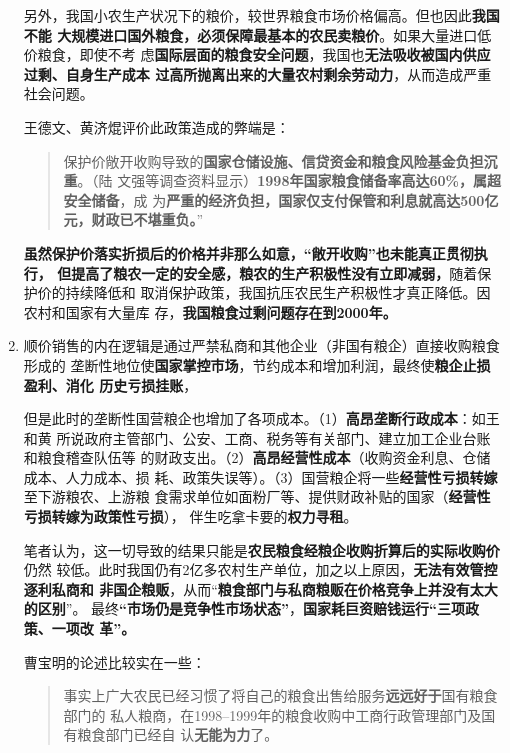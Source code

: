 \begin{enumerate}
  另外，我国小农生产状况下的粮价，较世界粮食市场价格偏高。但也因此\textbf{我国不能
    大规模进口国外粮食，必须保障最基本的农民卖粮价}。如果大量进口低价粮食，即使不考
  虑\textbf{国际层面的粮食安全问题}，我国也\textbf{无法吸收被国内供应过剩、自身生产成本
    过高所抛离出来的大量农村剩余劳动力}，从而造成严重社会问题。

  王德文、黄济焜评价此政策造成的弊端是：
  \begin{quotation}
    保护价敞开收购导致的\textbf{国家仓储设施、信贷资金和粮食风险基金负担沉重}。（陆
    文强等调查资料显示）\textbf{1998年国家粮食储备率高达60\%，属超安全储备}，成
    为\textbf{严重的经济负担，国家仅支付保管和利息就高达500亿元，财政已不堪重负。}”
  \end{quotation}

  \textbf{虽然保护价落实折损后的价格并非那么如意，“敞开收购”也未能真正贯彻执行，
    但提高了粮农一定的安全感，粮农的生产积极性没有立即减弱，}随着保护价的持续降低和
  取消保护政策，我国抗压农民生产积极性才真正降低。因农村和国家有大量库
  存，\textbf{我国粮食过剩问题存在到2000年。}

\item 顺价销售的内在逻辑是通过严禁私商和其他企业（非国有粮企）直接收购粮食形成的
  垄断性地位使\textbf{国家掌控市场}，节约成本和增加利润，最终使\textbf{粮企止损盈利、消化
    历史亏损挂账}，

  但是此时的垄断性国营粮企也增加了各项成本。（1）\textbf{高昂垄断行政成本}：如王和黄
  所说政府主管部门、公安、工商、税务等有关部门、建立加工企业台账和粮食稽查队伍等
  的财政支出。（2）\textbf{高昂经营性成本}（收购资金利息、仓储成本、人力成本、损
  耗、政策失误等）。（3）国营粮企将一些\textbf{经营性亏损转嫁}至下游粮农、上游粮
  食需求单位如面粉厂等、提供财政补贴的国家（\textbf{经营性亏损转嫁为政策性亏损}），
  伴生吃拿卡要的\textbf{权力寻租}。

  笔者认为，这一切导致的结果只能是\textbf{农民粮食经粮企收购折算后的实际收购价}仍然
  较低。此时我国仍有2亿多农村生产单位，加之以上原因，\textbf{无法有效管控逐利私商和
    非国企粮贩}，从而“\textbf{粮食部门与私商粮贩在价格竞争上并没有太大的区别}”。
  最终\textbf{“市场仍是竞争性市场状态”}，\textbf{国家耗巨资赔钱运行“三项政策、一项改
    革”。}

  曹宝明的论述比较实在一些：
  \begin{quotation}
    事实上广大农民已经习惯了将自己的粮食出售给服务\textbf{远远好于}国有粮食部门的
    私人粮商，在1998--1999年的粮食收购中工商行政管理部门及国有粮食部门已经自
    认\textbf{无能为力}了。\cite{caobaoming01}
  \end{quotation}


\end{enumerate}
